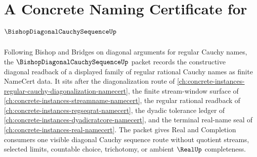 \chapter{A Concrete Naming Certificate for $\BishopDiagonalCauchySequenceUp$}
\label{ch:concrete-instances-bishop-diagonal-cauchy-sequence-namecert}

Following Bishop and Bridges on diagonal arguments for regular Cauchy names, the $\BishopDiagonalCauchySequenceUp$ packet records the constructive diagonal readback of a displayed family of regular rational Cauchy names as finite NameCert data. It sits after the diagonalization route of \autoref{ch:concrete-instances-regular-cauchy-diagonalization-namecert}, the finite stream-window surface of \autoref{ch:concrete-instances-streamname-namecert}, the regular rational readback of \autoref{ch:concrete-instances-regseqrat-namecert}, the dyadic tolerance ledger of \autoref{ch:concrete-instances-dyadicratcore-namecert}, and the terminal real-name seal of \autoref{ch:concrete-instances-real-namecert}. The packet gives Real and Completion consumers one visible diagonal Cauchy sequence route without quotient streams, selected limits, countable choice, trichotomy, or ambient $\RealUp$ completeness.


